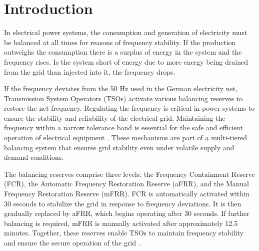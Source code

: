 \documentclass[class=scrbook, crop=false]{standalone}
\begin{document}
\chapter{Introduction}
\label{Chapter::Introduction}

In electrical power systems, the consumption and generation of electricity must be balanced at all times for reasons of frequency stability\cite{weitemeyerIntegrationRenewableEnergy2015}. If the production outweighs the consumption there is a surplus of energy in the system and the frequency rises. Is the system short of energy due to more energy being drained from the grid than injected into it, the frequency drops.

If the frequency deviates from the 50 Hz used in the German electricity net, Transmission System Operators (TSOs) activate various balancing reserves to restore the net frequency.
Regulating the frequency is critical in power systems to ensure the stability and reliability of the electrical grid.
Maintaining the frequency within a narrow tolerance band is essential for the safe and efficient operation of electrical equipment \cite{balazsShorttermSystemImbalance2024}.
These mechanisms are part of a multi-tiered balancing system that ensures grid stability even under volatile supply and demand conditions.


The balancing reserves comprise three levels: the Frequency Containment Reserve (FCR), the Automatic Frequency Restoration Reserve (aFRR), and the Manual Frequency Restoration Reserve (mFRR).
FCR is automatically activated within 30 seconds to stabilize the grid in response to frequency deviations. It is then gradually replaced by aFRR, which begins operating after 30 seconds. If further balancing is required, mFRR is manually activated after approximately 12.5 minutes.
Together, these reserves enable TSOs to maintain frequency stability and ensure the secure operation of the grid \cite{FrequencyReserves}.

\end{document}
